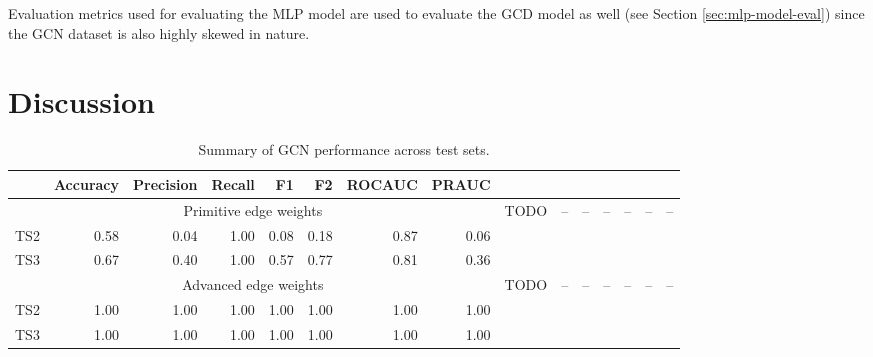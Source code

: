 Evaluation metrics used for evaluating the MLP model are used to
evaluate the GCD model as well (see Section \ref{sec:mlp-model-eval})
since the GCN dataset is also highly skewed in nature.

\section{Discussion}
\label{sec[gcd-disc]}

\begin{table}[htb]
  \begin{tabular}{lrrrrrrr}
    \hline
    & Accuracy & Precision & Recall & F1 & F2 & ROCAUC & PRAUC \\
    \hline
    \multicolumn{8}{c}{Primitive edge weights}
    \hline
    TS1 & TODO & -- & -- & -- & -- & -- & -- \\
    TS2 & 0.58 & 0.04 & 1.00 & 0.08 & 0.18 & 0.87 & 0.06 \\
    TS3 & 0.67 & 0.40 & 1.00 & 0.57 & 0.77 & 0.81 & 0.36 \\
    \hline
    \multicolumn{8}{c}{Advanced edge weights}
    \hline
    TS1 & TODO & -- & -- & -- & -- & -- & -- \\
    TS2 & 1.00 & 1.00 & 1.00 & 1.00 & 1.00 & 1.00 & 1.00 \\
    TS3 & 1.00 & 1.00 & 1.00 & 1.00 & 1.00 & 1.00 & 1.00 \\    
  \end{tabular}
  \caption{Summary of GCN performance across test sets.}
  \label{tab:gcn-results}
\end{table}

